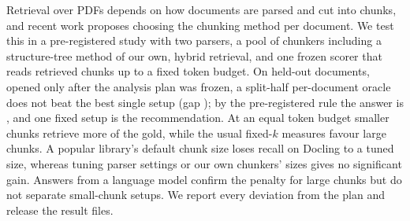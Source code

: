 Retrieval over PDFs depends on how documents are parsed and cut into
chunks, and recent work proposes choosing the chunking method per
document. We test this in a pre-registered study with two parsers, a pool
of chunkers including a structure-tree method of our own, hybrid
retrieval, and one frozen scorer that reads retrieved chunks up to a fixed
token budget. On \AccountingMain{} held-out documents, opened only after
the analysis plan was frozen, a split-half per-document oracle does not
beat the best single setup (gap \RQonePrimaryGap{} \RQonePrimaryGapCI{});
by the pre-registered rule the answer is \RQoneDecision{}, and one fixed
setup is the recommendation. At an equal token budget smaller chunks
retrieve more of the gold, while the usual fixed-$k$ measures favour
large chunks. A popular library's default chunk size loses
\RQfiveBLangchainRecursiveDoclingDiff{} recall on Docling to a tuned size, whereas
tuning parser settings or our own chunkers' sizes gives no significant
gain. Answers from a language model confirm the penalty for large chunks
but do not separate small-chunk setups. We report every deviation from
the plan and release the result files.
